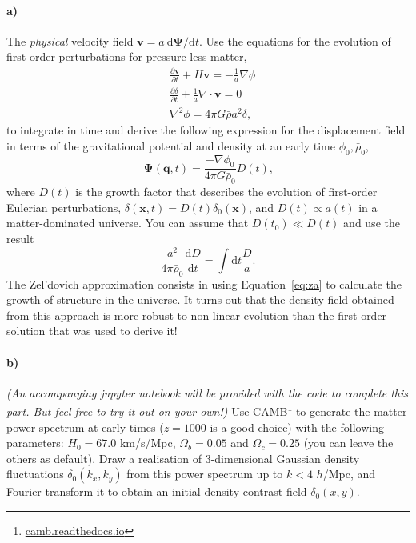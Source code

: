 \documentclass[12pt]{article}
\renewcommand\diff{\mathrm{d}}
\begin{document}
\paragraph{a)} The \emph{physical} velocity field $\mathbf{v} = a\: \diff\mathbf{\Psi}/\diff t$. Use
the equations for the evolution of first order perturbations for pressure-less
matter,
\begin{equation}
\begin{aligned}
    &\frac{\partial \mathbf{v}}{\partial t} + H \mathbf{v} = - \frac{1}{a} \nabla \phi \\
    &\frac{\partial \delta}{\partial t} + \frac{1}{a} \nabla \cdot \mathbf{v} = 0\\
    &\nabla^2 \phi = 4 \pi G \bar{\rho} a^2 \delta \text{,}
\end{aligned}
\label{eq:first-order}
\end{equation}
to integrate in time and derive the following expression for the displacement
field in terms of the gravitational potential and density at an early time
$\phi_0, \bar{\rho}_0$,
\begin{equation}
    \mathbf{\Psi}(\mathbf{q}, t) = \frac{-\nabla \phi_0}{4 \pi G \bar{\rho}_0} D(t)
    \text{,}
\label{eq:za}
\end{equation}
where $D(t)$ is the growth factor that describes the evolution of first-order
Eulerian perturbations, $\delta(\mathbf{x}, t) = D(t) \delta_0(\mathbf{x})$, and
$D(t) \propto a(t)$ in a matter-dominated universe. You can assume that $D(t_0)
\ll D(t)$ and use the result
\begin{equation}
    \frac{a^2}{4 \pi \bar{\rho}_0} \frac{\diff D}{\diff t} = \int \diff t \frac{D}{a} \text{.}
\end{equation}
The Zel'dovich approximation consists in using Equation~\ref{eq:za} to calculate
the growth of structure in the universe. It turns out that the density field
obtained from this approach is more robust to non-linear evolution than the
first-order solution that was used to derive it!

\paragraph{b)} \emph{(An accompanying jupyter notebook will be provided with the
code to complete this part. But feel free to try it out on your own!)} Use
CAMB\footnote{\url{camb.readthedocs.io}} to generate the matter power spectrum
at early times ($z=1000$ is a good choice) with the following parameters: $H_0 =
67.0$ km/s/Mpc, $\Omega_b = 0.05$ and $\Omega_c = 0.25$ (you can leave the
others as default). Draw a realisation of 3-dimensional Gaussian density
fluctuations $\delta_0(k_x, k_y)$ from this power spectrum up to $k < 4$
$h$/Mpc, and Fourier transform it to obtain an initial density contrast field
$\delta_0(x, y)$.
\end{document}
